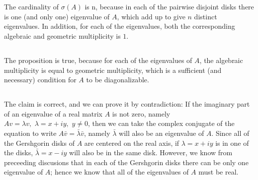 \documentclass[11pt]{article}
\begin{document}
\maketitle
\section{}

\section{}
\subsection{}
The cardinality of $\sigma(A)$ is n, because in each of the pairwise disjoint disks there is one (and only one) eigenvalue of $A$, which add up to give $n$ distinct eigenvalues. In addition, for each of the eigenvalues, both the corresponding algebraic and geometric multiplicity is $1$.

\subsection{}
The proposition is true, because for each of the eigenvalues of $A$, the algebraic multiplicity is equal to geometric multiplicity, which is a sufficient (and necessary) condition for $A$ to be diagonalizable.

\subsection{}
The claim is correct, and we can prove it by contradiction: If the imaginary part of an eigenvalue of a real matrix $A$ is not zero, namely $Av=\lambda v,\,\,\lambda =x+iy,\,\,y\neq0$, then we can take the complex conjugate of the equation to write $A\bar v = \bar\lambda\bar v$, namely $\bar\lambda$ will also be an eigenvalue of $A$. Since all of the Gershgorin disks of $A$ are centered on the real axis, if $\lambda=x+iy$ is in one of the disks, $\bar\lambda=x-iy$ will also be in the same disk. However, we know from preceeding discusions that in each of the Gershgorin disks there can be only one eigenvalue of $A$; hence we know that all of the eigenvalues of $A$ must be real.
\end{document}

